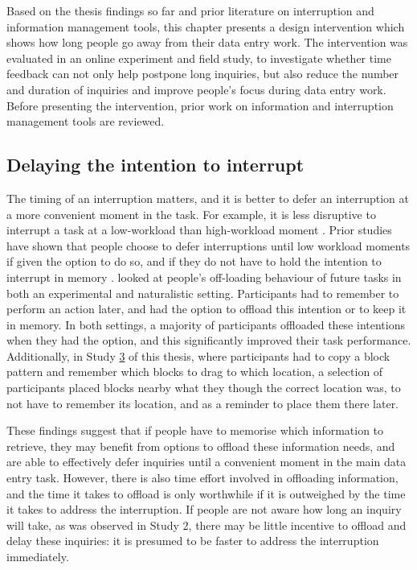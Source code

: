 Based on the thesis findings so far and prior literature on interruption and information management tools, this chapter presents a design intervention which shows how long people go away from their data entry work. The intervention was evaluated in an online experiment and field study, to investigate whether time feedback can not only help postpone long inquiries, but also reduce the number and duration of inquiries and improve people’s focus during data entry work. Before presenting the intervention, prior work on information and interruption management tools are reviewed. 

\subsection{Delaying the intention to interrupt}
The timing of an interruption matters, and it is better to defer an interruption at a more convenient moment in the task. For example, it is less disruptive to interrupt a task at a low-workload than high-workload moment \citep{Gould2013a, Iqbal2005}. Prior studies have shown that people choose to defer interruptions until low workload moments if given the option to do so, and if they do not have to hold the intention to interrupt in memory \citep{Gilbert2015, Salvucci2010}. \citet{Gilbert2015} looked at people’s off-loading behaviour of future tasks in both an experimental and naturalistic setting. Participants had to remember to perform an action later, and had the option to offload this intention or to keep it in memory. In both settings, a majority of participants offloaded these intentions when they had the option, and this significantly improved their task performance. Additionally, in Study \hyperref[st:Study3]{3} of this thesis, where participants had to copy a block pattern and remember which blocks to drag to which location, a selection of participants placed blocks nearby what they though the correct location was, to not have to remember its location, and as a reminder to place them there later. 

These findings suggest that if people have to memorise which information to retrieve, they may benefit from options to offload these information needs, and are able to effectively defer inquiries until a convenient moment in the main data entry task. However, there is also time effort involved in offloading information, and the time it takes to offload is only worthwhile if it is outweighed by the time it takes to address the interruption. If people are not aware how long an inquiry will take, as was observed in Study 2, there may be little incentive to offload and delay these inquiries: it is presumed to be faster to address the interruption immediately.

